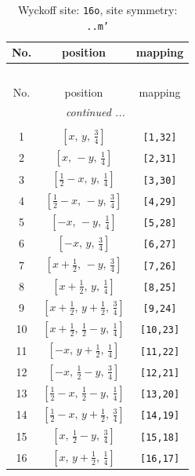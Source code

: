 \documentclass[fleqn,8pt]{jsarticle}
\begin{document}
\renewcommand{\arraystretch}{1.2}
\begin{longtable}{ccc}
\caption{Wyckoff site: {\tt 16o}, site symmetry: {\tt ..m'}}
 \\
 \hline \hline
No. & position & mapping \\ \hline \endfirsthead

\multicolumn{2}{l}{\tablename\ \thetable{}} \\
 \hline \hline
No. & position & mapping \\ \hline \endhead

 \hline \hline
\multicolumn{2}{r}{\footnotesize\it continued ...} \\ \endfoot

 \hline \hline
\multicolumn{2}{r}{} \\ \endlastfoot

1 & $\left[ x,\, y,\, \frac{3}{4} \right]$ & {\tt [1,32]} \\ \hline
2 & $\left[ x,\, - y,\, \frac{1}{4} \right]$ & {\tt [2,31]} \\ \hline
3 & $\left[ \frac{1}{2} - x,\, y,\, \frac{1}{4} \right]$ & {\tt [3,30]} \\ \hline
4 & $\left[ \frac{1}{2} - x,\, - y,\, \frac{3}{4} \right]$ & {\tt [4,29]} \\ \hline
5 & $\left[ - x,\, - y,\, \frac{1}{4} \right]$ & {\tt [5,28]} \\ \hline
6 & $\left[ - x,\, y,\, \frac{3}{4} \right]$ & {\tt [6,27]} \\ \hline
7 & $\left[ x + \frac{1}{2},\, - y,\, \frac{3}{4} \right]$ & {\tt [7,26]} \\ \hline
8 & $\left[ x + \frac{1}{2},\, y,\, \frac{1}{4} \right]$ & {\tt [8,25]} \\ \hline
9 & $\left[ x + \frac{1}{2},\, y + \frac{1}{2},\, \frac{3}{4} \right]$ & {\tt [9,24]} \\ \hline
10 & $\left[ x + \frac{1}{2},\, \frac{1}{2} - y,\, \frac{1}{4} \right]$ & {\tt [10,23]} \\ \hline
11 & $\left[ - x,\, y + \frac{1}{2},\, \frac{1}{4} \right]$ & {\tt [11,22]} \\ \hline
12 & $\left[ - x,\, \frac{1}{2} - y,\, \frac{3}{4} \right]$ & {\tt [12,21]} \\ \hline
13 & $\left[ \frac{1}{2} - x,\, \frac{1}{2} - y,\, \frac{1}{4} \right]$ & {\tt [13,20]} \\ \hline
14 & $\left[ \frac{1}{2} - x,\, y + \frac{1}{2},\, \frac{3}{4} \right]$ & {\tt [14,19]} \\ \hline
15 & $\left[ x,\, \frac{1}{2} - y,\, \frac{3}{4} \right]$ & {\tt [15,18]} \\ \hline
16 & $\left[ x,\, y + \frac{1}{2},\, \frac{1}{4} \right]$ & {\tt [16,17]} \\
\end{longtable}
\end{document}
